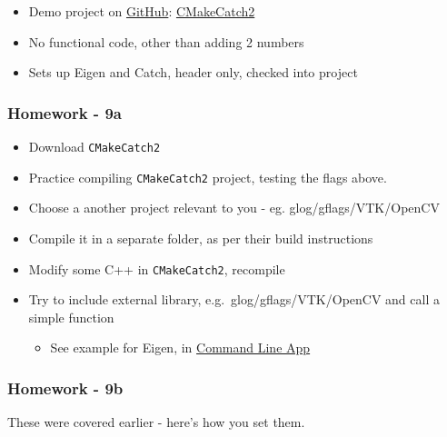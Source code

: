 \begin{itemize}
\itemsep1pt\parskip0pt
\item
  Demo project on \href{https://github.com}{GitHub}:
  \href{https://github.com/MattClarkson/CMakeCatch2}{CMakeCatch2}
\item
  No functional code, other than adding 2 numbers
\item
  Sets up Eigen and Catch, header only, checked into project
\end{itemize}

\subsubsection{Homework - 9a}\label{homework---9a}

\begin{itemize}
\itemsep1pt\parskip0pt
\item
  Download \texttt{CMakeCatch2}
\item
  Practice compiling \texttt{CMakeCatch2} project, testing the flags
  above.
\item
  Choose a another project relevant to you - eg. glog/gflags/VTK/OpenCV
\item
  Compile it in a separate folder, as per their build instructions
\item
  Modify some C++ in \texttt{CMakeCatch2}, recompile
\item
  Try to include external library, e.g.~glog/gflags/VTK/OpenCV and call
  a simple function

  \begin{itemize}
  \itemsep1pt\parskip0pt
  \item
    See example for Eigen, in
    \href{https://github.com/MattClarkson/CMakeCatch2/blob/master/Code/CommandLineApps/mpMyFirstApp.cpp}{Command
    Line App}
  \end{itemize}
\end{itemize}

\subsubsection{Homework - 9b}\label{homework---9b}

These were covered earlier - here's how you set them.

